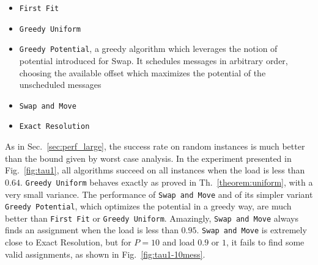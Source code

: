 \documentclass[a4paper,UKenglish,cleveref, autoref, thm-restate]{lipics-v2019}
\newcommand\firstfit{\texttt{First Fit}\xspace}
\newcommand\greedyuniform{\texttt{Greedy Uniform}\xspace}
\newcommand\swapandmove{\texttt{Swap and Move}\xspace}
\newcommand\greedypotential{\texttt{Greedy Potential}\xspace}
\begin{document}
\begin{itemize}
  \item \firstfit
  \item \greedyuniform 
  \item \greedypotential, a greedy algorithm which leverages the notion of potential introduced for Swap. 
  It schedules messages in arbitrary order, choosing the available offset which maximizes the potential of the unscheduled messages
  \item \swapandmove 
  \item \texttt{Exact Resolution}
\end{itemize}

As in Sec.~\ref{sec:perf_large}, the success rate on random instances is much better than the bound given by worst case analysis. In the experiment presented in Fig.~\ref{fig:tau1}, all algorithms succeed on all instances when the load is less than $0.64$. \greedyuniform behaves exactly as proved in Th.~\ref{theorem:uniform}, with a very small variance. The performance of \swapandmove and of its simpler variant \greedypotential, which optimizes the potential in a greedy way, are much better than \firstfit or \greedyuniform. Amazingly, \swapandmove always finds an assignment when the load is less than $0.95$. \swapandmove is extremely close to Exact Resolution, but for $P=10$ and load $0.9$ or $1$, it fails to find some valid assignments, as shown in Fig.~\ref{fig:tau1-10mess}.
\end{document}
